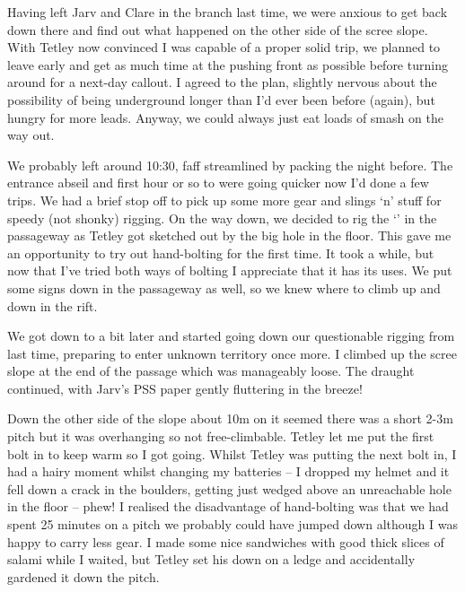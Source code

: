 Having left Jarv and Clare in the  branch last time, we were anxious to get back down there and find out what happened on the other side of the scree slope. With Tetley now convinced I was capable of a proper solid trip, we planned to leave early and get as much time at the pushing front as possible before turning around for a next-day callout. I agreed to the plan, slightly nervous about the possibility of being underground longer than I'd ever been before (again), but hungry for more leads. Anyway, we could always just eat loads of smash on the way out.

We probably left around 10:30, faff streamlined by packing the night before. The entrance abseil and first hour or so to  were going quicker now I'd done a few trips. We had a brief stop off to pick up some more gear and slings `n' stuff for speedy (not shonky) rigging. On the way down, we decided to rig the `' in the  passageway as Tetley got sketched out by the big hole in the floor. This gave me an opportunity to try out hand-bolting for the first time. It took a while, but now that I've tried both ways of bolting I appreciate that it has its uses. We put some signs down in the  passageway as well, so we knew where to climb up and down in the rift.

We got down to  a bit later and started going down our questionable rigging from last time, preparing to enter unknown territory once more. I climbed up the scree slope at the end of the passage which was manageably loose. The draught continued, with Jarv's PSS paper gently fluttering in the breeze! 

Down the other side of the slope about 10m on it seemed there was a short 2-3m pitch but it was overhanging so not free-climbable. Tetley let me put the first bolt in to keep warm so I got going. Whilst Tetley was putting the next bolt in, I had a hairy moment whilst changing my batteries – I dropped my helmet and it fell down a crack in the boulders, getting just wedged above an unreachable hole in the floor – phew! I realised the disadvantage of hand-bolting was that we had spent 25 minutes on a pitch we probably could have jumped down although I was happy to carry less gear. I made some nice sandwiches with good thick slices of salami while I waited, but Tetley set his down on a ledge and accidentally gardened it down the pitch. 

